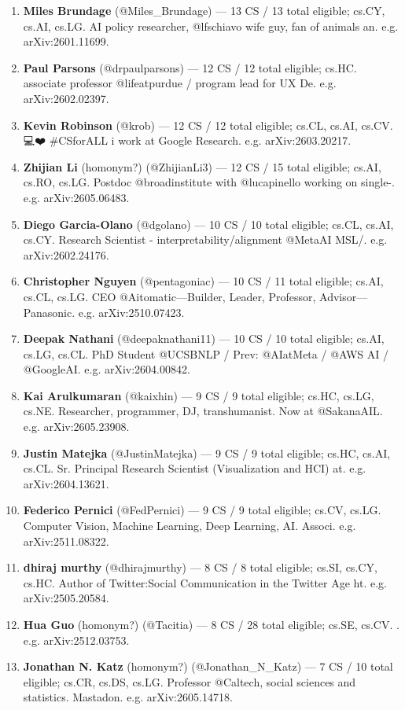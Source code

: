 \documentclass[twocolumn,10pt,letterpaper]{article}
\begin{document}
\begin{enumerate}
  \item \textbf{Miles Brundage} (@Miles\_Brundage) — 13 CS / 13 total eligible; cs.CY, cs.AI, cs.LG. AI policy researcher, @lfschiavo wife guy, fan of animals an. e.g. arXiv:2601.11699.
  \item \textbf{Paul Parsons} (@drpaulparsons) — 12 CS / 12 total eligible; cs.HC. associate professor @lifeatpurdue  /  program lead for UX De. e.g. arXiv:2602.02397.
  \item \textbf{Kevin Robinson} (@krob) — 12 CS / 12 total eligible; cs.CL, cs.AI, cs.CV. 💻❤️ \#CSforALL i work at Google Research. e.g. arXiv:2603.20217.
  \item \textbf{Zhijian Li} (homonym?) (@ZhijianLi3) — 12 CS / 15 total eligible; cs.AI, cs.RO, cs.LG. Postdoc @broadinstitute with @lucapinello working on single-. e.g. arXiv:2605.06483.
  \item \textbf{Diego Garcia-Olano} (@dgolano) — 10 CS / 10 total eligible; cs.CL, cs.AI, cs.CY. Research Scientist - interpretability/alignment @MetaAI MSL/. e.g. arXiv:2602.24176.
  \item \textbf{Christopher Nguyen} (@pentagoniac) — 10 CS / 11 total eligible; cs.AI, cs.CL, cs.LG. CEO @Aitomatic—Builder, Leader, Professor, Advisor—Panasonic. e.g. arXiv:2510.07423.
  \item \textbf{Deepak Nathani} (@deepaknathani11) — 10 CS / 10 total eligible; cs.AI, cs.LG, cs.CL. PhD Student @UCSBNLP / Prev: @AIatMeta / @AWS AI / @GoogleAI. e.g. arXiv:2604.00842.
  \item \textbf{Kai Arulkumaran} (@kaixhin) — 9 CS / 9 total eligible; cs.HC, cs.LG, cs.NE. Researcher, programmer, DJ, transhumanist. Now at @SakanaAIL. e.g. arXiv:2605.23908.
  \item \textbf{Justin Matejka} (@JustinMatejka) — 9 CS / 9 total eligible; cs.HC, cs.AI, cs.CL. Sr. Principal Research Scientist (Visualization and HCI) at. e.g. arXiv:2604.13621.
  \item \textbf{Federico Pernici} (@FedPernici) — 9 CS / 9 total eligible; cs.CV, cs.LG. Computer Vision, Machine Learning, Deep Learning, AI. Associ. e.g. arXiv:2511.08322.
  \item \textbf{dhiraj murthy} (@dhirajmurthy) — 8 CS / 8 total eligible; cs.SI, cs.CY, cs.HC. Author of Twitter:Social Communication in the Twitter Age ht. e.g. arXiv:2505.20584.
  \item \textbf{Hua Guo} (homonym?) (@Tacitia) — 8 CS / 28 total eligible; cs.SE, cs.CV. . e.g. arXiv:2512.03753.
  \item \textbf{Jonathan N. Katz} (homonym?) (@Jonathan\_N\_Katz) — 7 CS / 10 total eligible; cs.CR, cs.DS, cs.LG. Professor @Caltech, social sciences and statistics. Mastadon. e.g. arXiv:2605.14718.

\end{enumerate}
\end{document}
